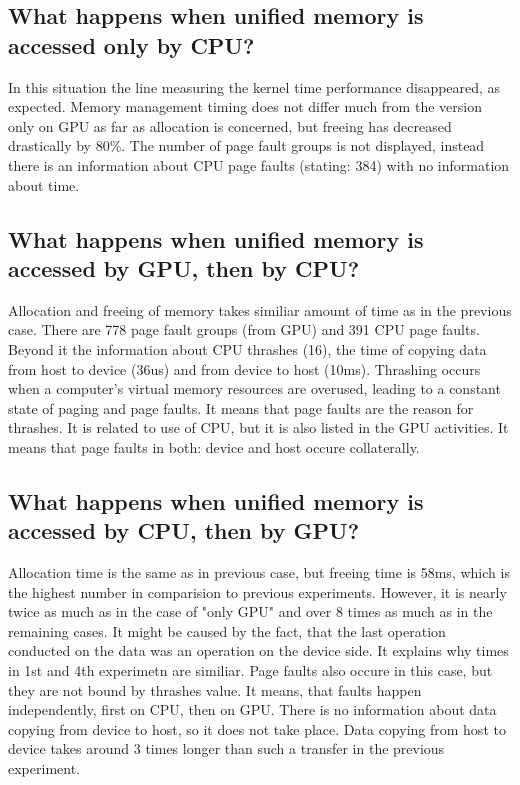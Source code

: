 \documentclass[12pt]{article}
\begin{document}
\subsection{What happens when unified memory is accessed only by CPU?} 
In this situation the line measuring the kernel time performance disappeared, as expected. Memory management timing does not differ much from the version only on GPU as far as allocation is concerned, but freeing has decreased drastically by 80\%. The number of page fault groups is not displayed, instead there is an information about CPU page faults (stating: 384) with no information about time.

\subsection{What happens when unified memory is accessed by GPU, then by CPU?} 
Allocation and freeing of memory takes similiar amount of time as in the previous case. There are 778 page fault groups (from GPU) and 391 CPU page faults. Beyond it the information about CPU thrashes (16), the time of copying data from host to device (36us) and from device to host (10ms). Thrashing occurs when a computer's virtual memory resources are overused, leading to a constant state of paging and page faults. It means that page faults are the reason for thrashes. It is related to use of CPU, but it is also listed in the GPU activities. It means that page faults in both: device and host occure collaterally.

\subsection{What happens when unified memory is accessed by CPU, then by GPU?}
Allocation time is the same as in previous case, but freeing time is 58ms, which is the highest number in comparision to previous experiments. However, it is nearly twice as much as in the case of "only GPU" and over 8 times as much as in the remaining cases. It might be caused by the fact, that the last operation conducted on the data was an operation on the device side. It explains why times in 1st and 4th experimetn are similiar. 
Page faults also occure in this case, but they are not bound by thrashes value. It means, that faults happen independently, first on CPU, then on GPU. There is no information about data copying from device to host, so it does not take place. Data copying from host to device takes around 3 times longer than such a transfer in the previous experiment.
\end{document}
